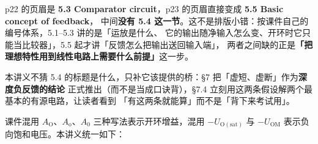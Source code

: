 \documentclass[11pt]{ctexart}
\begin{document}

p22 的页眉是 \textbf{5.3 Comparator circuit}，p23 的页眉直接变成 \textbf{5.5 Basic concept of feedback}，
中间\textbf{没有 5.4 这一节}。这不是排版小错：按课件自己的编号体系，5.1--5.3 讲的是「运放是什么、
它的输出随净输入怎么变、开环时它只能当比较器」，5.5 起才讲「反馈怎么把输出送回输入端」，
两者之间缺的正是\textbf{「把理想特性用到线性电路上需要什么前提」}这一步。

本讲义不猜 5.4 的标题是什么，只补它该提供的桥：§7 把「虚短、虚断」作为\textbf{深度负反馈的结论}
正式推出（而不是当成口诀背），§7.4 立刻用这两条假设解两个最基本的有源电路，让读者看到
「有这两条就能算」而不是「背下来考试用」。


课件混用 $A_{\mathrm{O}}$、$A_{\mathrm{o}}$、$A_0$ 三种写法表示开环增益，混用 $-U_{\mathrm{O(sat)}}$
与 $-U_{\mathrm{OM}}$ 表示负向饱和电压。本讲义统一如下：
\end{document}
